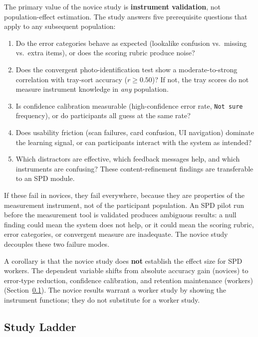 \documentclass[10pt,a4paper]{article}
\begin{document}
The primary value of the novice study is \textbf{instrument validation}, not
population-effect estimation. The study answers five prerequisite questions
that apply to any subsequent population:
\begin{enumerate}
  \item Do the error categories behave as expected (lookalike confusion vs.\
  missing vs.\ extra items), or does the scoring rubric produce noise?
  \item Does the convergent photo-identification test show a moderate-to-strong
  correlation with tray-sort accuracy ($r \ge 0.50$)? If not, the tray scores
  do not measure instrument knowledge in \emph{any} population.
  \item Is confidence calibration measurable (high-confidence error rate,
  \texttt{Not sure} frequency), or do participants all guess at the same rate?
  \item Does usability friction (scan failures, card confusion, UI navigation)
  dominate the learning signal, or can participants interact with the system
  as intended?
  \item Which distractors are effective, which feedback messages help, and
  which instruments are confusing? These content-refinement findings are
  transferable to an SPD module.
\end{enumerate}
If these fail in novices, they fail everywhere, because they are properties
of the measurement instrument, not of the participant population. An SPD
pilot run before the measurement tool is validated produces ambiguous results:
a null finding could mean the system does not help, or it could mean the
scoring rubric, error categories, or convergent measure are inadequate.
The novice study decouples these two failure modes.

A corollary is that the novice study does \textbf{not} establish the effect
size for SPD workers. The dependent variable shifts from absolute accuracy
gain (novices) to error-type reduction, confidence calibration, and retention
maintenance (workers) (Section~\ref{sec:study-ladder}). The
novice results warrant a worker study by showing the instrument functions;
they do not substitute for a worker study.

\subsection{Study Ladder}
\label{sec:study-ladder}
\end{document}
